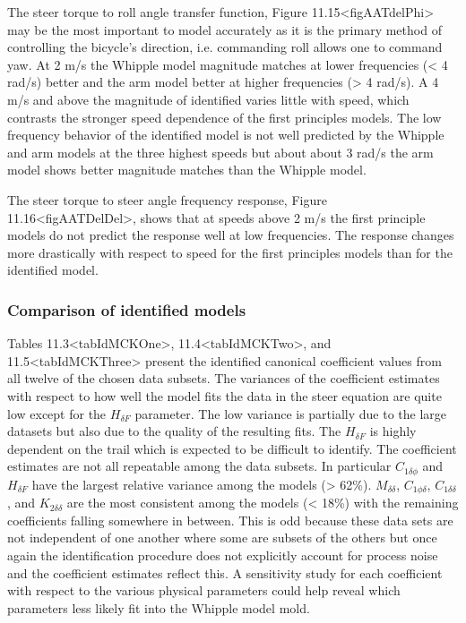 \documentclass[a4paper]{article}
\begin{document}
The steer torque to roll angle transfer function, Figure
11.15\textless{}figAATdelPhi\textgreater{} may be the most important to
model accurately as it is the primary method of controlling the
bicycle's direction, i.e. commanding roll allows one to command yaw. At
2 m/s the Whipple model magnitude matches at lower frequencies
(\textless{} 4 rad/s) better and the arm model better at higher
frequencies (\textgreater{} 4 rad/s). A 4 m/s and above the magnitude of
identified varies little with speed, which contrasts the stronger speed
dependence of the first principles models. The low frequency behavior of
the identified model is not well predicted by the Whipple and arm models
at the three highest speeds but about about 3 rad/s the arm model shows
better magnitude matches than the Whipple model.


The steer torque to steer angle frequency response, Figure
11.16\textless{}figAATDelDel\textgreater{}, shows that at speeds above 2
m/s the first principle models do not predict the response well at low
frequencies. The response changes more drastically with respect to speed
for the first principles models than for the identified model.


\subsubsection{Comparison of identified models}

Tables 11.3\textless{}tabIdMCKOne\textgreater{},
11.4\textless{}tabIdMCKTwo\textgreater{}, and
11.5\textless{}tabIdMCKThree\textgreater{} present the identified
canonical coefficient values from all twelve of the chosen data subsets.
The variances of the coefficient estimates with respect to how well the
model fits the data in the steer equation are quite low except for the
$H_{\delta F}$ parameter. The low variance is partially due to the large
datasets but also due to the quality of the resulting fits. The
$H_{\delta F}$ is highly dependent on the trail which is expected to be
difficult to identify. The coefficient estimates are not all repeatable
among the data subsets. In particular $C_{1\delta\phi}$ and
$H_{\delta F}$ have the largest relative variance among the models
(\textgreater{} 62\%). $M_{\delta\delta}$, $C_{1\phi\delta}$,
$C_{1\delta\delta}$, and $K_{2\delta\delta}$ are the most consistent
among the models (\textless{} 18\%) with the remaining coefficients
falling somewhere in between. This is odd because these data sets are
not independent of one another where some are subsets of the others but
once again the identification procedure does not explicitly account for
process noise and the coefficient estimates reflect this. A sensitivity
study for each coefficient with respect to the various physical
parameters could help reveal which parameters less likely fit into the
Whipple model mold.
\end{document}
